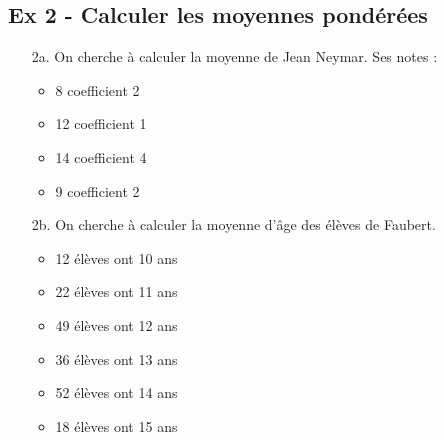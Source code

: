 \begin{multicols}{2}

  \subsection*{Ex 2 - Calculer les moyennes pondérées}

  \begin{enumerate}
  \item[2a.] On cherche à calculer la moyenne de Jean Neymar. Ses notes :\\
  \begin{itemize}[label={$\bullet$}]
    \item 8 coefficient 2
    \item 12 coefficient 1
    \item 14 coefficient 4
    \item 9 coefficient 2
  \end{itemize} 

  \item[2b.]  On cherche à calculer la moyenne d'âge des élèves de Faubert. \\
  \begin{itemize}[label={$\bullet$}]
    \item 12 élèves ont 10 ans
    \item 22 élèves ont 11 ans
    \item 49 élèves ont 12 ans
    \item 36 élèves ont 13 ans
    \item 52 élèves ont 14 ans
    \item 18 élèves ont 15 ans
\end{itemize} 

\end{enumerate} 

\columnbreak

\Pointilles[26]

\end{multicols}

\newpage

